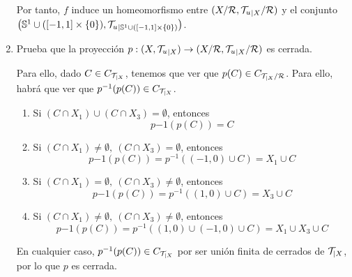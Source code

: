 \documentclass[12pt]{article}
\newcommand{\T}[0]{\cc{T}}
\begin{document}
\begin{ejercicio}[3 puntos]
\begin{enumerate}
            Por tanto, $f$ induce un homeomorfismo entre $(X/\cc{R},{\T_u}_{|X} / {\cc{R}})$ y el conjunto $\left(\bb{S}^1 \cup ([-1,1]\times \{0\}), {\T_u}_{|\bb{S}^1 \cup ([-1,1]\times \{0\})}\right)$.


            

            \item Prueba que la proyección $p:(X,{\T_u}_{|X})\to (X/\cc{R},{\T_u}_{|X} / {\cc{R}})$ es cerrada.
            
            Para ello, dado $C\in C_{\T_{|X}}$, tenemos que ver que $p(C)\in C_{\T_{|X}/\cc{R}}$.
            Para ello, habrá que ver que $p^{-1}(p(C))\in C_{\T_{|X}}$.
            \begin{enumerate}
                \item Si $(C\cap X_1)\cup (C\cap X_3)=\emptyset$, entonces $$p{-1}(p(C))=C$$
                \item Si $(C\cap X_1)\neq \emptyset,~ (C\cap X_3)= \emptyset$, entonces $$p{-1}(p(C))=p^{-1}((-1,0)\cup C) = X_1 \cup C$$
                \item Si $(C\cap X_1)= \emptyset,~ (C\cap X_3)\neq \emptyset$, entonces $$p{-1}(p(C))=p^{-1}((1,0)\cup C) = X_3 \cup C$$
                \item Si $(C\cap X_1)\neq \emptyset,~ (C\cap X_3)\neq \emptyset$, entonces $$p{-1}(p(C))=p^{-1}((1,0)\cup (-1,0)\cup C) = X_1 \cup X_3 \cup C$$
            \end{enumerate}
            En cualquier caso, $p^{-1}(p(C))\in C_{\T_{|X}}$ por ser unión finita de cerrados de $\T_{|X}$, por lo que $p$ es cerrada.
        \end{enumerate}
    \end{ejercicio}
\end{document}
